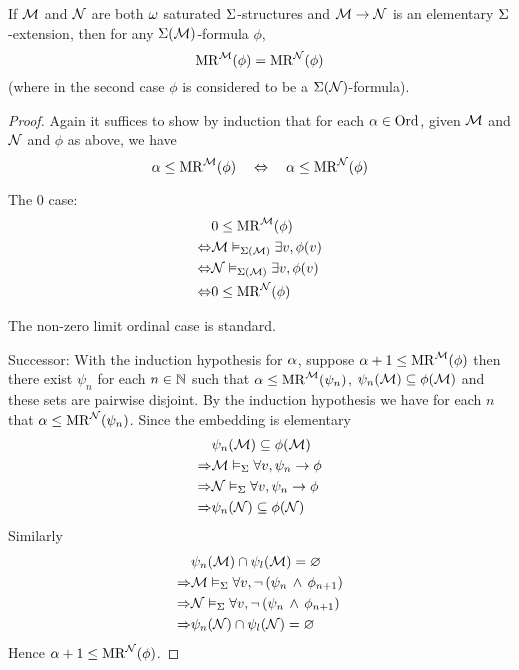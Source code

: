 \begin{lem}
    If $\mathcal{M}$ and $\mathcal{N}$ are both $\omega$ saturated $\Sigma$-structures and 
    $\mathcal{M} \to \mathcal{N}$ is an elementary $\Sigma$-extension, 
    then for any $\Sigma(\mathcal{M})$-formula $\phi$,
    \[\mathrm{MR}^{\mathcal{M}}(\phi) = \mathrm{MR}^{\mathcal{N}}(\phi)\]
    (where in the second case $\phi$ is considered to be a $\Sigma(\mathcal{N})$-formula).
\end{lem}
\begin{proof}
    Again it suffices to show by induction that for each $\alpha \in \operatorname{Ord}$, 
    given $\mathcal{M}$ and $\mathcal{N}$ and $\phi$ as above, we have
    \[\alpha \leq \mathrm{MR}^{\mathcal{M}}(\phi) \quad \Leftrightarrow \quad \alpha \leq \mathrm{MR}^{\mathcal{N}}(\phi)\]

    The $0$ case: \begin{align*}
        & 0 \leq \mathrm{MR}^{\mathcal{M}}(\phi)\\
        \Leftrightarrow & \mathcal{M} \vDash_{\Sigma(\mathcal{M})} \exists v, \phi(v)\\
        \Leftrightarrow & \mathcal{N} \vDash_{\Sigma(\mathcal{M})} \exists v, \phi(v)\\
        \Leftrightarrow & 0 \leq \mathrm{MR}^{\mathcal{N}}(\phi)
    \end{align*} 

    The non-zero limit ordinal case is standard.

    Successor:
    With the induction hypothesis for $\alpha$, 
    suppose $\alpha + 1 \leq \mathrm{MR}^{\mathcal{M}}(\phi)$
    then there exist $\psi_n$ for each $n \in \mathbb{N}$ such that 
    $\alpha \leq \mathrm{MR}^{\mathcal{M}}(\psi_n)$, 
    $\psi_n(\mathcal{M}) \subseteq \phi(\mathcal{M})$ and these sets are pairwise disjoint.
    By the induction hypothesis we have for each $n$ that 
    $\alpha \leq \mathrm{MR}^{\mathcal{N}}(\psi_n)$. 
    Since the embedding is elementary
    \begin{align*}
        &\psi_n(\mathcal{M}) \subseteq \phi(\mathcal{M})\\
        \Rightarrow & \mathcal{M} \vDash_{\Sigma} \forall v, \psi_n \to \phi\\
        \Rightarrow & \mathcal{N} \vDash_{\Sigma} \forall v, \psi_n \to \phi\\
        \Rightarrow & \psi_n(\mathcal{N}) \subseteq \phi(\mathcal{N})
    \end{align*}
    Similarly 
    \begin{align*}
        &\psi_n(\mathcal{M}) \cap \psi_{l}(\mathcal{M}) = \varnothing\\
        \Rightarrow & \mathcal{M} \vDash_{\Sigma} \forall v, \neg\, (\psi_n \, \land \, \phi_{n+1})\\
        \Rightarrow & \mathcal{N} \vDash_{\Sigma} \forall v, \neg\, (\psi_n \, \land \, \phi_{n+1})\\
        \Rightarrow & \psi_n(\mathcal{N}) \cap \psi_{l}(\mathcal{N}) = \varnothing
    \end{align*}
    Hence $\alpha + 1 \leq \mathrm{MR}^{\mathcal{N}}(\phi)$.


\end{proof}
